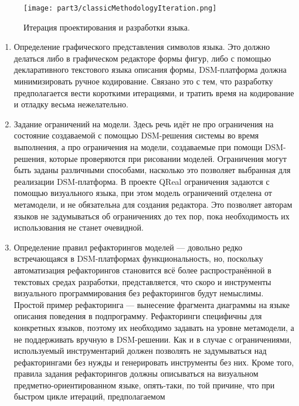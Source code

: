 \begin{figure} [ht]
	\begin{center}
		\texttt{[image: part3/classicMethodologyIteration.png]}
		\caption{Итерация проектирования и разработки языка.}
		\label{classicMethodologyIteration}
	\end{center}
\end{figure}

\begin{enumerate}
	\item Определение графического представления символов языка. Это должно делаться 
		либо в графическом редакторе формы фигур, либо с помощью декларативного текстового
		языка описания формы, DSM-платформа должна минимизировать ручное кодирование. 
		Связано это с тем, что разработку предполагается вести короткими итерациями, и 
		тратить время на кодирование и отладку весьма нежелательно.
	\item Задание ограничений на модели. Здесь речь идёт не про ограничения на состояние 
		создаваемой с помощью DSM-решения системы во время выполнения, а про ограничения 
		на модели, создаваемые при помощи DSM-решения, которые проверяются при рисовании 
		моделей. Ограничения могут быть заданы различными способами, насколько это позволяет
		выбранная для реализации DSM-платформа. В проекте QReal ограничения задаются с помощью 
		визуального языка, при этом модель ограничений отделена от метамодели, и не обязательна 
		для создания редактора. Это позволяет авторам языков не задумываться об ограничениях 
		до тех пор, пока необходимость их использования не станет очевидной.
	\item Определение правил рефакторингов моделей --- довольно редко встречающаяся в 
		DSM-платформах функциональность, но, поскольку автоматизация рефакторингов становится 
		всё более распространённой в текстовых средах разработки, представляется, что 
		скоро и инструменты визуального программирования без рефакторингов будут немыслимы. 
		Простой пример рефакторинга --- вынесение фрагмента диаграммы на языке описания 
		поведения в подпрограмму. Рефакторинги специфичны для конкретных языков, поэтому 
		их необходимо задавать на уровне метамодели, а не поддерживать вручную в DSM-решении. 
		Как и в случае с ограничениями, используемый инструментарий должен позволять не 
		задумываться над рефакторингами без нужды и генерировать инструменты без них. Кроме 
		того, правила задания рефакторингов должны описываться на визуальном предметно-ориентированном 
		языке, опять-таки, по той причине, что при быстром цикле итераций, предполагаемом 

\end{enumerate}
